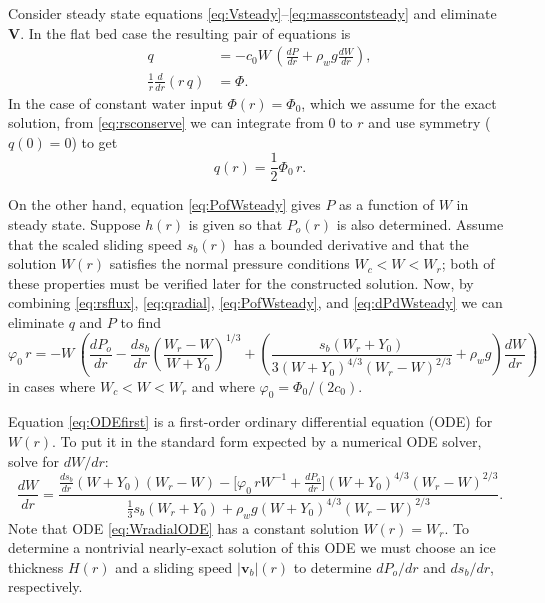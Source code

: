 \documentclass[11pt,final]{amsart}%
\newcommand\bv{\mathbf{v}}
\newcommand\bV{\mathbf{V}}
\begin{document}
Consider steady state equations \eqref{eq:Vsteady}--\eqref{eq:masscontsteady} and eliminate $\bV$.  In the flat bed case the resulting pair of equations is
\begin{align}
q &= - c_0 W\, \left(\frac{dP}{dr} + \rho_w g \frac{dW}{dr}\right), \label{eq:rsflux} \\
\frac{1}{r}\frac{d}{dr}\left(r\,q\right) &= \Phi. \label{eq:rsconserve}
\end{align}
In the case of constant water input $\Phi(r)=\Phi_0$, which we assume for the exact solution, from \eqref{eq:rsconserve} we can integrate from $0$ to $r$ and use symmetry ($q(0)=0$) to get
\begin{equation}
q(r) = \frac{1}{2} \Phi_0\, r. \label{eq:qradial}
\end{equation}

On the other hand, equation \eqref{eq:PofWsteady} gives $P$ as a function of $W$ in steady state.  Suppose $h(r)$ is given so that $P_o(r)$ is also determined.  Assume that the scaled sliding speed $s_b(r)$ has a bounded derivative and that the solution $W(r)$ satisfies the normal pressure conditions $W_c < W < W_r$; both of these properties must be verified later for the constructed solution.  Now, by combining \eqref{eq:rsflux}, \eqref{eq:qradial}, \eqref{eq:PofWsteady}, and \eqref{eq:dPdWsteady} we can eliminate $q$ and $P$ to find
\begin{equation}
\varphi_0\, r = - W\, \left(\frac{dP_o}{dr} - \frac{ds_b}{dr} \left(\frac{W_r - W}{W+Y_0}\right)^{1/3} + \left(\frac{s_b (W_r + Y_0)}{3 (W+Y_0)^{4/3} (W_r - W)^{2/3}} + \rho_w g\right) \frac{dW}{dr}\right)  \label{eq:ODEfirst}
\end{equation}
in cases where $W_c < W < W_r$ and where $\varphi_0 = \Phi_0 / (2 c_0)$. 

Equation \eqref{eq:ODEfirst} is a first-order ordinary differential equation (ODE) for $W(r)$.  To put it in the standard form expected by a numerical ODE solver, solve for $dW/dr$:
\begin{equation}
\frac{dW}{dr} = \frac{\frac{ds_b}{dr} (W+Y_0) (W_r - W) - \Big[\varphi_0\, r W^{-1} + \frac{dP_o}{dr}\Big] (W + Y_0)^{4/3} \left(W_r - W\right)^{2/3}}{\frac{1}{3} s_b (W_r + Y_0) + \rho_w g (W + Y_0)^{4/3} (W_r - W)^{2/3}}.
\label{eq:WradialODE}
\end{equation}
Note that ODE \eqref{eq:WradialODE} has a constant solution $W(r)=W_r$.  To determine a nontrivial nearly-exact solution of this ODE we must choose an ice thickness $H(r)$ and a sliding speed $|\bv_b|(r)$ to determine $dP_o/dr$ and $ds_b/dr$, respectively.
\end{document}

